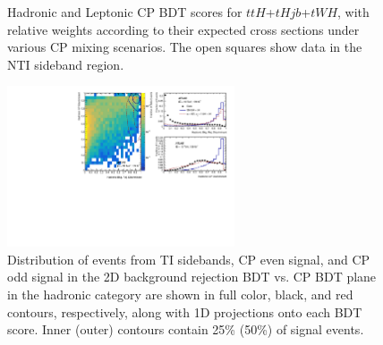 \begin{figure}[htbp]
  \centering
  \caption{Hadronic and Leptonic CP BDT scores for $ttH$+$tHjb$+$tWH$, with relative weights according to their expected cross sections under various CP mixing scenarios.  The open squares show data in the NTI sideband region. }
  \label{fig:cpscores}
\end{figure}

\begin{figure}[htbp]
 \centering
  	\includegraphics[width=0.6\textwidth]{figures/tthcp_chapter/categorization_xgb/BDTdist_had_zero.pdf}
  \caption{Distribution of events from TI sidebands, CP even signal, and CP odd signal in the 2D background rejection BDT vs. CP BDT plane in the hadronic category are shown in full color, black, and red contours, respectively, along with 1D projections onto each BDT score. Inner (outer) contours contain 25\% (50\%) of signal events.}
  \label{fig:2dbdthad}
\end{figure}

